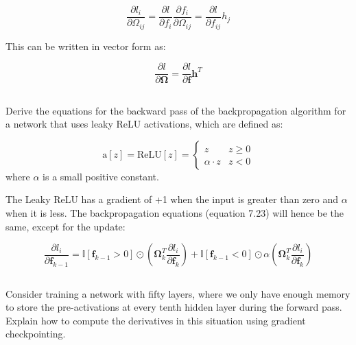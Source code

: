 \documentclass[12pt]{report}
\begin{document}
\begin{equation*}
    \frac{\partial l_{i}}{\partial \Omega_{ij}} = \frac{\partial l}{\partial f_{i}}\frac{\partial f_{i}}{\partial \Omega_{ij}} = \frac{\partial l}{\partial f_{ij}}h_{j}
\end{equation*}

This can be written in vector form as:

\begin{equation*}
    \frac{\partial l}{\partial \boldsymbol{\Omega}} = \frac{\partial l}{\partial \mathbf{f}}\mathbf{h}^{T}
\end{equation*}

\newpage
\subsection{}
\begin{mdframed}
    Derive the equations for the  backward pass of the backpropagation algorithm for a network that uses leaky ReLU activations, which are defined as:

    \begin{equation*}
        \text{a}[z] = \text{ReLU}[z] = \begin{cases}
            z             & z \geq 0 \\
            \alpha\cdot z & z < 0
        \end{cases}
    \end{equation*}
    where $\alpha$ is a small positive constant.
\end{mdframed}

The Leaky ReLU has a gradient of +1 when the input is greater than zero and $\alpha$ when it is less. The backpropagation equations (equation 7.23) will hence be the same, except for the update:

\begin{equation*}
    \frac{\partial l_{i}}{\partial \mathbf{f}_{k-1}} = \mathbb{I}[\mathbf{f}_{k-1} > 0] \odot \left(\boldsymbol{\Omega}_{k}^{T}\frac{\partial l_{i}}{\partial \mathbf{f}_{k}}\right) + \mathbb{I}[\mathbf{f}_{k-1} < 0] \odot \alpha\left(\boldsymbol{\Omega}_{k}^{T}\frac{\partial l_{i}}{\partial \mathbf{f}_{k}}\right)
\end{equation*}

\subsection{}
\begin{mdframed}
    Consider training a network with fifty layers, where we only have enough memory to store the pre-activations at every tenth hidden layer during the forward pass. Explain how to compute the derivatives in this situation using gradient checkpointing.
\end{mdframed}
\end{document}
